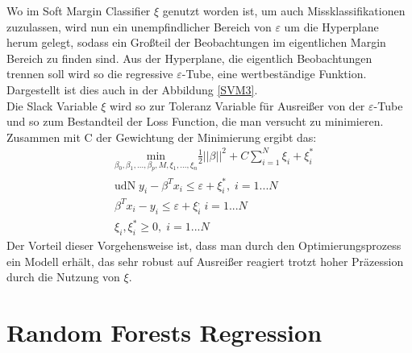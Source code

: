 \documentclass[a4paper,12pt]{thesis}
\begin{document}
Wo im Soft Margin Classifier $\xi$ genutzt worden ist, um auch Missklassifikationen zuzulassen, wird nun ein unempfindlicher Bereich von $\varepsilon$ um die Hyperplane herum gelegt, sodass ein Großteil der Beobachtungen im eigentlichen Margin Bereich zu finden sind. Aus der Hyperplane, die eigentlich Beobachtungen trennen soll wird so die regressive $\varepsilon$-Tube, eine wertbeständige Funktion. Dargestellt ist dies auch in der Abbildung \ref{SVM3}.\\
Die Slack Variable $\xi$ wird so zur Toleranz Variable für Ausreißer von der $\varepsilon$-Tube und so zum Bestandteil der Loss Function, die man versucht zu minimieren. Zusammen mit C der Gewichtung der Minimierung ergibt das:
\begin{equation}
	\label{SVM:Regression}
	\begin{aligned}
		&\underset{\beta_0, \beta_1, ... , \beta_p,M,\xi_1,...,\xi_n}{\text{min}}\frac{1}{2}||\beta||^2 + C\sum_{i=1}^N \xi_i + \xi_i^*\\
		&\text{udN}\; y_i - \beta^T x_i \leq \varepsilon + \xi_i^*, \; i=1...N\\
		&\beta^T x_i - y_i \leq \varepsilon + \xi_i^, \; i=1...N\\
		&\xi_i, \xi_i^* \geq 0, \; i=1...N
	\end{aligned} 
\end{equation}
Der Vorteil dieser Vorgehensweise ist, dass man durch den Optimierungsprozess ein Modell erhält, das sehr robust auf Ausreißer reagiert trotzt hoher Präzession durch die Nutzung von $\xi$.

\section{Random Forests Regression}
\end{document}
